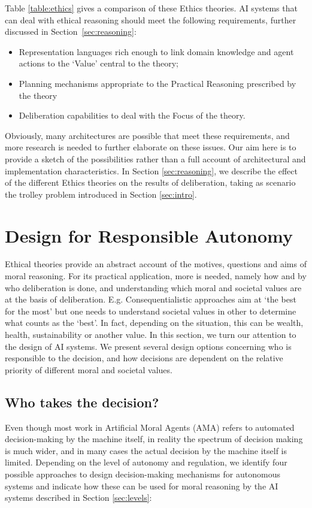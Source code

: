 \documentclass[twocolumn]{article}
\begin{document}
Table \ref{table:ethics} gives a comparison of these Ethics theories. AI systems that can deal with ethical reasoning should meet the following requirements, further discussed in Section~\ref{sec:reasoning}:
\begin{itemize}
\item Representation languages rich enough to link domain knowledge and agent actions to the `Value' central to the theory; 
\item Planning mechanisms appropriate to the Practical Reasoning prescribed by the theory
\item Deliberation capabilities to deal with the Focus of the theory.
\end{itemize}
Obviously, many architectures are possible that meet these requirements, and more research is needed to further elaborate on these issues. Our aim here is to provide a sketch of the possibilities rather than a full account of architectural and implementation characteristics. In  Section \ref{sec:reasoning}, we describe the effect of the different Ethics theories on the results of deliberation, taking as scenario the trolley problem introduced in Section \ref{sec:intro}. 



\section{Design for Responsible Autonomy}\label{sec:design}
Ethical theories provide an abstract account of the motives, questions and aims of moral reasoning. For its practical application, more is needed, namely how and by who deliberation is done, and understanding which moral and societal values are at the basis of deliberation. E.g. Consequentialistic approaches aim at `the best for the most' but one needs to understand societal values in other to determine what counts as the `best'. In fact, depending on the situation, this can be wealth, health, sustainability or another value. In this section, we turn our attention to the design of AI systems.
We present several design options concerning who is responsible to the decision, and how decisions are dependent on the relative priority of different moral and societal values.




\subsection{Who takes the decision?}\label{sec:who}
Even though most work in Artificial Moral Agents (AMA) refers to automated decision-making by the machine itself, in reality the spectrum of decision making is much wider, and in many cases the actual decision by the machine itself is limited. Depending on the level of autonomy and regulation, we identify four possible approaches to design decision-making mechanisms for autonomous systems and indicate how these can be used for moral reasoning by the AI systems described in Section \ref{sec:levels}: %
\end{document}
